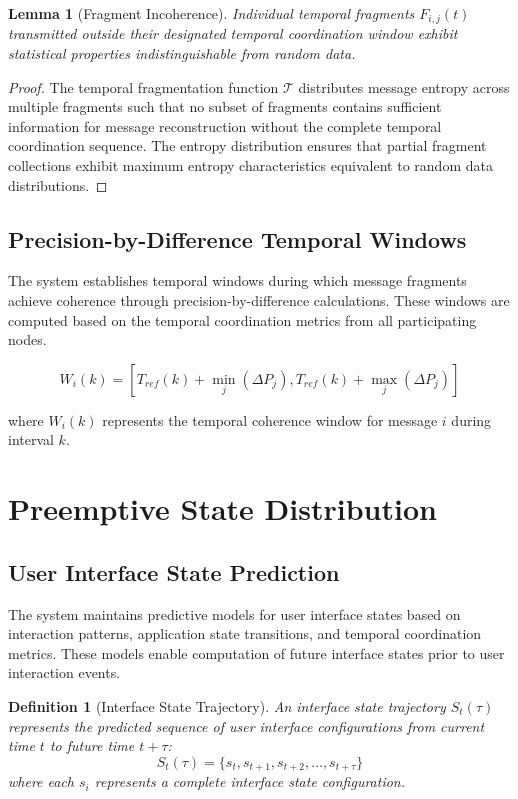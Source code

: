 \documentclass[12pt,a4paper]{article}
\newtheorem{lemma}{Lemma}
\newtheorem{definition}{Definition}
\begin{document}
\begin{lemma}[Fragment Incoherence]
Individual temporal fragments $F_{i,j}(t)$ transmitted outside their designated temporal coordination window exhibit statistical properties indistinguishable from random data.
\end{lemma}

\begin{proof}
The temporal fragmentation function $\mathcal{T}$ distributes message entropy across multiple fragments such that no subset of fragments contains sufficient information for message reconstruction without the complete temporal coordination sequence. The entropy distribution ensures that partial fragment collections exhibit maximum entropy characteristics equivalent to random data distributions.
\end{proof}

\subsection{Precision-by-Difference Temporal Windows}

The system establishes temporal windows during which message fragments achieve coherence through precision-by-difference calculations. These windows are computed based on the temporal coordination metrics from all participating nodes.

\begin{equation}
W_i(k) = \left[ T_{ref}(k) + \min_j(\Delta P_j), T_{ref}(k) + \max_j(\Delta P_j) \right]
\end{equation}

where $W_i(k)$ represents the temporal coherence window for message $i$ during interval $k$.

\section{Preemptive State Distribution}

\subsection{User Interface State Prediction}

The system maintains predictive models for user interface states based on interaction patterns, application state transitions, and temporal coordination metrics. These models enable computation of future interface states prior to user interaction events.

\begin{definition}[Interface State Trajectory]
An interface state trajectory $S_t(\tau)$ represents the predicted sequence of user interface configurations from current time $t$ to future time $t + \tau$:
\begin{equation}
S_t(\tau) = \{s_t, s_{t+1}, s_{t+2}, \ldots, s_{t+\tau}\}
\end{equation}
where each $s_i$ represents a complete interface state configuration.
\end{definition}
\end{document}
